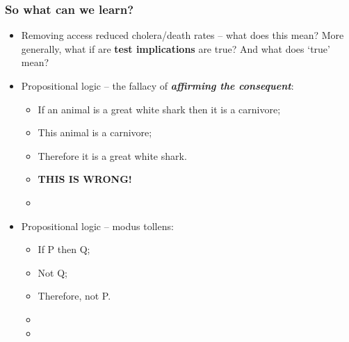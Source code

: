 \documentclass[aspectratio=169]{beamer}
\theoremstyle{principle}
\begin{document}
\begin{frame}
\frametitle{So what can we learn?}
\begin{itemize}
\item Removing access reduced cholera/death rates -- what does this mean?  More generally, what if are \textbf{test implications} are true?  And what does `true' mean?
\bigskip
\item Propositional logic -- the fallacy of \textit{\textbf{affirming the consequent}}:
\begin{itemize}
\item If an animal is a great white shark then it is a carnivore;
\item This animal is a carnivore;
\item Therefore it is a great white shark.
\item \textbf{THIS IS WRONG!}
\item[]
\end{itemize}
\bigskip
\item[]  \color{white}Propositional logic -- modus tollens:
\begin{itemize}
\item[] \color{white}If P then Q;
\item[] \color{white}Not Q;
\item[] \color{white}Therefore, not P.
\item[]
\item[]
 \end{itemize}
\end{itemize}

\end{frame}
\end{document}
